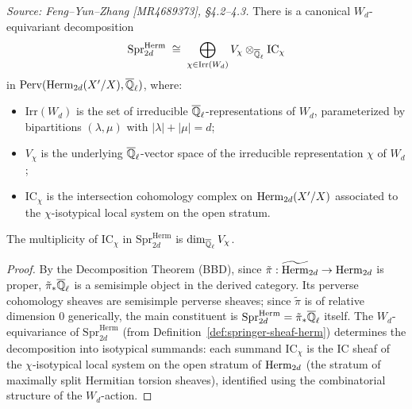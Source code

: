 \begin{theorem}
  \label{thm:springer-decomp}
  \textit{Source: Feng--Yun--Zhang [MR4689373], \S4.2--4.3.}
  There is a canonical \(W_d\)-equivariant decomposition
  \[
    \mathrm{Spr}^{\mathrm{Herm}}_{2d}
    \;\cong\;
    \bigoplus_{\chi \in \mathrm{Irr}(W_d)}
    V_\chi \otimes_{\overline{\mathbb{Q}}_\ell} \mathrm{IC}_\chi
  \]
  in \(\mathrm{Perv}(\operatorname{Herm}_{2d}(X'/X), \overline{\mathbb{Q}}_\ell)\), where:
  \begin{itemize}
    \item \(\mathrm{Irr}(W_d)\) is the set of irreducible \(\overline{\mathbb{Q}}_\ell\)-representations of
      \(W_d\), parameterized by bipartitions \((\lambda, \mu)\) with
      \(|\lambda| + |\mu| = d\);
    \item \(V_\chi\) is the underlying \(\overline{\mathbb{Q}}_\ell\)-vector space of the irreducible
      representation \(\chi\) of \(W_d\);
    \item \(\mathrm{IC}_\chi\) is the intersection cohomology complex on
      \(\operatorname{Herm}_{2d}(X'/X)\) associated to the \(\chi\)-isotypical local system on
      the open stratum.
  \end{itemize}
  The multiplicity of \(\mathrm{IC}_\chi\) in \(\mathrm{Spr}^{\mathrm{Herm}}_{2d}\)
  is \(\dim_{\overline{\mathbb{Q}}_\ell} V_\chi\).
\end{theorem}

\begin{proof}
  By the Decomposition Theorem (BBD), since
  \(\tilde\pi : \widetilde{\operatorname{Herm}}_{2d} \to \operatorname{Herm}_{2d}\) is proper,
  \(\tilde\pi_*\overline{\mathbb{Q}}_\ell\) is a semisimple object in the derived category. Its
  perverse cohomology sheaves are semisimple perverse sheaves; since \(\tilde\pi\)
  is of relative dimension \(0\) generically, the main constituent is
  \(\mathrm{Spr}^{\mathrm{Herm}}_{2d} = \tilde\pi_*\overline{\mathbb{Q}}_\ell\) itself.
  The \(W_d\)-equivariance of \(\mathrm{Spr}^{\mathrm{Herm}}_{2d}\) (from
  Definition~\ref{def:springer-sheaf-herm}) determines the decomposition into
  isotypical summands: each summand \(\mathrm{IC}_\chi\) is the IC sheaf of the
  \(\chi\)-isotypical local system on the open stratum of \(\operatorname{Herm}_{2d}\) (the stratum
  of maximally split Hermitian torsion sheaves), identified using the combinatorial
  structure of the \(W_d\)-action.
\end{proof}
